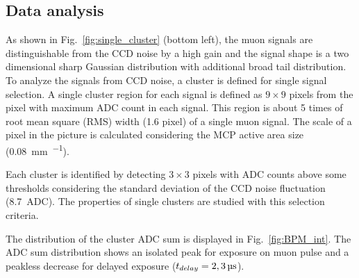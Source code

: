 \documentclass[preprint,3p,twocolumn]{elsarticle}
\begin{document}
\subsection{Data analysis}


As shown in Fig.~\ref{fig:single_cluster} (bottom left), the muon signals are distinguishable from the CCD noise by a high gain and the signal shape is a two dimensional sharp Gaussian distribution with additional broad tail distribution. 
To analyze the signals from CCD noise, a cluster is defined for single signal selection. A single cluster region for each signal is defined as $9 \times 9$ pixels from the pixel with maximum ADC count in each signal. This region is about 5 times of root mean square (RMS) width (1.6 pixel) of a single muon signal. The scale of a pixel in the picture is calculated considering the MCP active area size (\SI{0.08}{\mm \per \pixel}).

Each cluster is identified by detecting $3 \times 3$ pixels with ADC counts above some thresholds considering the standard deviation of the CCD noise fluctuation (\SI{8.7}{ADC}). The properties of single clusters are studied with this selection criteria.

The distribution of the cluster ADC sum is displayed in Fig.~\ref{fig:BPM_int}.
The ADC sum distribution shows an isolated peak for exposure on muon pulse and a peakless decrease for delayed exposure ($t_{delay} = \SIlist[list-pair-separator = {, }, list-units = single]{2; 3}{\micro\s}$).
\end{document}
